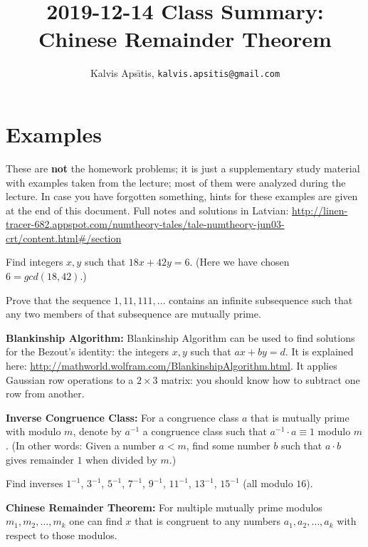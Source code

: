 \documentclass[jou]{apa6}
\title{2019-12-14 Class Summary: Chinese Remainder Theorem}
\author{Kalvis Aps\={\i}tis, {\small \tt kalvis.apsitis}{\small \tt @gmail.com}}
\affiliation{Riga Business School (RBS), University of Latvia (LU)}
\begin{document}
\maketitle


\section{Examples}

These are {\bf not} the homework problems; it is just a supplementary study material 
with examples taken from the lecture; most of them were analyzed during the lecture.
In case you have forgotten something, hints for these examples are given at the end of this document.
Full notes and solutions in Latvian: \url{http://linen-tracer-682.appspot.com/numtheory-tales/tale-numtheory-jun03-crt/content.html#/section}

\begin{problem}
Find integers $x,y$ such that $18x + 42y = 6$. 
(Here we have chosen $6 = \mathit{gcd}(18,42)$.)
\end{problem}

\begin{problem} 
Prove that the sequence $1,11,111,\ldots$ contains
an infinite subsequence such that any two members of that subsequence
are mutually prime.
\end{problem}

{\bf Blankinship Algorithm:} Blankinship Algorithm can be 
used to find solutions for the 
Bezout's identity: the integers $x,y$ such that $ax+by=d$.
It is explained here: \url{http://mathworld.wolfram.com/BlankinshipAlgorithm.html}.
It applies Gaussian row operations to a $2 \times 3$ matrix: you 
should know how to subtract one row from another.

{\bf Inverse Congruence Class:} For a congruence class $a$ 
that is mutually prime with modulo $m$, denote by $a^{-1}$ 
a congruence class such that $a^{-1}\cdot a \equiv 1$ modulo $m$. 
(In other words: Given a number $a < m$, find some number $b$
such that $a \cdot b$ gives remainder $1$ when divided by $m$.)


\begin{problem} 
Find inverses $1^{-1}$, $3^{-1}$, $5^{-1}$, $7^{-1}$, $9^{-1}$, $11^{-1}$, $13^{-1}$, $15^{-1}$
(all modulo $16$).
\end{problem}

{\bf Chinese Remainder Theorem:}
For multiple mutually prime modulos $m_1,m_2,\ldots,m_k$ one can find $x$ that is 
congruent to any numbers $a_1,a_2,\ldots,a_k$ with respect to those modulos.
\end{document}
